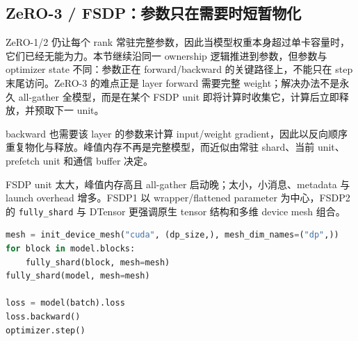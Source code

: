 
\subsection{ZeRO-3 / FSDP：参数只在需要时短暂物化}

ZeRO-1/2 仍让每个 rank 常驻完整参数，因此当模型权重本身超过单卡容量时，它们已经无能为力。本节继续沿同一 ownership 逻辑推进到参数，但参数与 optimizer state 不同：参数正在 forward/backward 的关键路径上，不能只在 step 末尾访问。ZeRO-3 的难点正是 layer forward 需要完整 weight；解决办法不是永久 all-gather 全模型，而是在某个 FSDP unit 即将计算时收集它，计算后立即释放，并预取下一 unit。



backward 也需要该 layer 的参数来计算 input/weight gradient，因此以反向顺序重复物化与释放。峰值内存不再是完整模型，而近似由常驻 shard、当前 unit、prefetch unit 和通信 buffer 决定。



FSDP unit 太大，峰值内存高且 all-gather 启动晚；太小，小消息、metadata 与 launch overhead 增多。FSDP1 以 wrapper/flattened parameter 为中心，FSDP2 的 \texttt{fully\_shard} 与 DTensor 更强调原生 tensor 结构和多维 device mesh 组合。


\begin{lstlisting}[language=Python,caption={FSDP2 的逐层 fully\_shard 示意}]
mesh = init_device_mesh("cuda", (dp_size,), mesh_dim_names=("dp",))
for block in model.blocks:
    fully_shard(block, mesh=mesh)
fully_shard(model, mesh=mesh)

loss = model(batch).loss
loss.backward()
optimizer.step()
\end{lstlisting}

